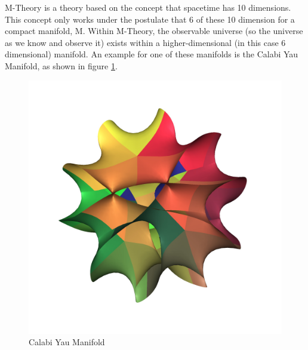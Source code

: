 \documentclass[../paper.tex]{subfiles}
\begin{document}
M-Theory is a theory based on the concept that spacetime has 10 dimensions. This concept only works under the postulate that 6 of these 10 dimension for a compact manifold, M. Within M-Theory, the observable universe (so the universe as we know and observe it) exists within a higher-dimensional (in this case 6 dimensional) manifold. An example for one of these manifolds is the Calabi Yau Manifold, as shown in figure \ref{Calabi Yau}. 

\begin{figure}[!htb]
\centering
\includegraphics[scale = 0.1]{M-Theory/calabiyau.jpg}
\caption{Calabi Yau Manifold}
\label{Calabi Yau}
\end{figure}
\end{document}
